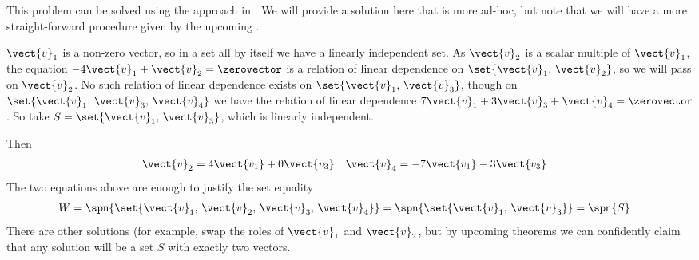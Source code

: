 This problem can be solved using the approach in .  We will provide a solution here that is more ad-hoc, but note that we will have a more straight-forward procedure given by the upcoming .\par
%
$\vect{v}_1$ is a non-zero vector, so in a set all by itself we have a linearly independent set.  As $\vect{v}_2$ is a scalar multiple of $\vect{v}_1$, the equation $-4\vect{v}_1+\vect{v}_2=\zerovector$ is a relation of linear dependence on $\set{\vect{v}_1,\,\vect{v}_2}$, so we will pass on $\vect{v}_2$.  No such relation of linear dependence exists on $\set{\vect{v}_1,\,\vect{v}_3}$, though on $\set{\vect{v}_1,\,\vect{v}_3,\,\vect{v}_4}$ we have the relation of linear dependence
$7\vect{v}_1+3\vect{v}_3+\vect{v}_4=\zerovector$.
So take $S=\set{\vect{v}_1,\,\vect{v}_3}$, which is linearly independent.\par
%
Then
%
\begin{align*}
\vect{v}_2&=4\vect{v_1}+0\vect{v_3}
&
\vect{v}_4&=-7\vect{v_1}-3\vect{v_3}
\end{align*}
%
The two equations above are enough to justify the set equality
%
\begin{align*}
W
&=\spn{\set{\vect{v}_1,\,\vect{v}_2,\,\vect{v}_3,\,\vect{v}_4}}
=\spn{\set{\vect{v}_1,\,\vect{v}_3}}
=\spn{S}
\end{align*}
%
There are other solutions (for example, swap the roles of $\vect{v}_1$ and $\vect{v}_2$, but by upcoming theorems we can confidently claim that any solution will be a set $S$ with exactly two vectors.
